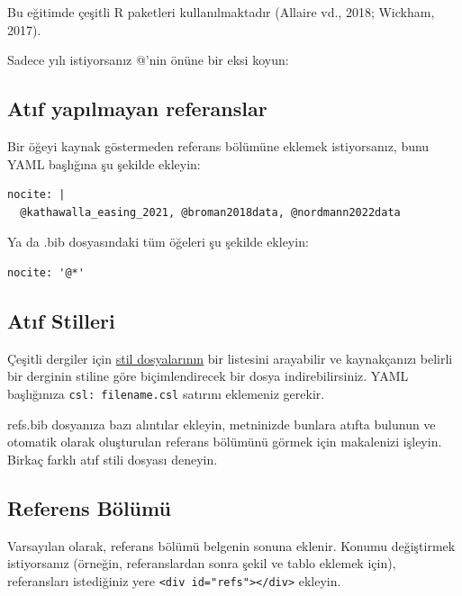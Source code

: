 \documentclass[
  oneside]{book}
\begin{document}
Bu eğitimde çeşitli R paketleri kullanılmaktadır (Allaire vd., 2018; Wickham, 2017).

Sadece yılı istiyorsanız @'nin önüne bir eksi koyun:

\hypertarget{atux131f-yapux131lmayan-referanslar}{%
\subsection{Atıf yapılmayan referanslar}\label{atux131f-yapux131lmayan-referanslar}}

Bir öğeyi kaynak göstermeden referans bölümüne eklemek istiyorsanız, bunu YAML başlığına şu şekilde ekleyin:

\begin{verbatim}
nocite: |
  @kathawalla_easing_2021, @broman2018data, @nordmann2022data
\end{verbatim}

Ya da .bib dosyasındaki tüm öğeleri şu şekilde ekleyin:

\begin{verbatim}
nocite: '@*'
\end{verbatim}

\hypertarget{atux131f-stilleri}{%
\subsection{Atıf Stilleri}\label{atux131f-stilleri}}

Çeşitli dergiler için \href{https://www.zotero.org/styles}{stil dosyalarının} bir listesini arayabilir ve kaynakçanızı belirli bir derginin stiline göre biçimlendirecek bir dosya indirebilirsiniz. YAML başlığınıza \texttt{csl:\ filename.csl} satırını eklemeniz gerekir.

\begin{try}
refs.bib dosyanıza bazı alıntılar ekleyin, metninizde bunlara atıfta bulunun ve otomatik olarak oluşturulan referans bölümünü görmek için makalenizi işleyin. Birkaç farklı atıf stili dosyası deneyin.

\end{try}

\hypertarget{referens-buxf6luxfcmuxfc}{%
\subsection{Referens Bölümü}\label{referens-buxf6luxfcmuxfc}}

Varsayılan olarak, referans bölümü belgenin sonuna eklenir. Konumu değiştirmek istiyorsanız (örneğin, referanslardan sonra şekil ve tablo eklemek için), referansları istediğiniz yere \texttt{\textless{}div\ id="refs"\textgreater{}\textless{}/div\textgreater{}} ekleyin.
\end{document}
